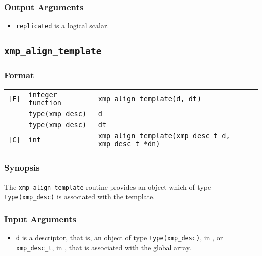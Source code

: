 \subsubsection*{Output Arguments}
\begin{itemize}
 \item {\tt replicated} is a logical scalar.
\end{itemize}


\subsection{\tt xmp\_align\_template}

\subsubsection*{Format}

\begin{tabular}{lll}

\verb![F]!& {\tt integer function}& {\tt xmp\_align\_template(d, dt)}\\
          & {\tt type(xmp\_desc)} & {\tt d}\\
          & {\tt type(xmp\_desc)} & {\tt dt}\\

\verb![C]!&  {\tt int}& {\tt xmp\_align\_template(xmp\_desc\_t d, xmp\_desc\_t *dn)}\\

\end{tabular}

\subsubsection*{Synopsis}

The {\tt xmp\_align\_template} routine provides an object which of type {\tt type(xmp\_desc)} is associated with the template.


\subsubsection*{Input Arguments}
\begin{itemize}
 \item {\tt d} is a descriptor, that is, an object of type 
       {\tt type(xmp\_desc)}, in {\XMPF}, or {\tt xmp\_desc\_t},
       in {\XMPC}, that is associated with the global array.
\end{itemize}

